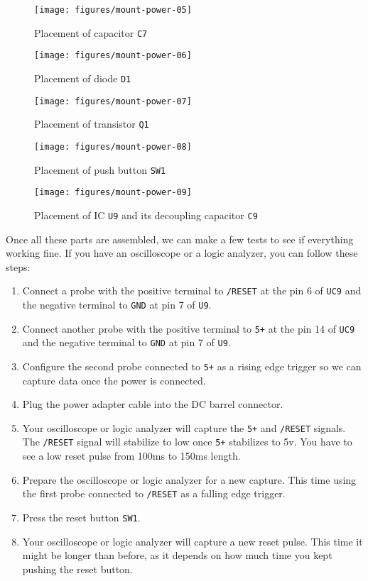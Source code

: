 \begin{figure}[htbp]
  \centering
  \texttt{[image: figures/mount-power-05]}
  \caption{Placement of capacitor {\tt C7}}
  \label{fig:mount-power-05}
\end{figure}

\begin{figure}[htbp]
  \centering
  \texttt{[image: figures/mount-power-06]}
  \caption{Placement of diode {\tt D1}}
  \label{fig:mount-power-06}
\end{figure}

\begin{figure}[htbp]
  \centering
  \texttt{[image: figures/mount-power-07]}
  \caption{Placement of transistor {\tt Q1}}
  \label{fig:mount-power-07}
\end{figure}

\begin{figure}[htbp]
  \centering
  \texttt{[image: figures/mount-power-08]}
  \caption{Placement of push button {\tt SW1}}
  \label{fig:mount-power-08}
\end{figure}

\begin{figure}[htbp]
  \centering
  \texttt{[image: figures/mount-power-09]}
  \caption{Placement of IC {\tt U9} and its decoupling capacitor {\tt C9}}
  \label{fig:mount-power-09}
\end{figure}

Once all these parts are assembled, we can make a few tests to see if everything working fine. If you have an oscilloscope or a logic analyzer, you can follow these steps:

\begin{enumerate}
  \item Connect a probe with the positive terminal to {\tt /RESET} at the pin 6 of {\tt UC9} and the negative terminal to {\tt GND} at pin 7 of {\tt U9}.
  \item Connect another probe with the positive terminal to {\tt 5+} at the pin 14 of {\tt UC9} and the negative terminal to {\tt GND} at pin 7 of {\tt U9}.
  \item Configure the second probe connected to {\tt 5+} as a rising edge trigger so we can capture data once the power is connected.
  \item Plug the power adapter cable into the DC barrel connector.
  \item Your oscilloscope or logic analyzer will capture the {\tt 5+} and {\tt /RESET} signals. The {\tt /RESET} signal will stabilize to low once {\tt 5+} stabilizes to 5v. You have to see a low reset pulse from 100ms to 150ms length.
  \item Prepare the oscilloscope or logic analyzer for a new capture. This time using the first probe connected to {\tt /RESET} as a falling edge trigger.
  \item Press the reset button {\tt SW1}.
  \item Your oscilloscope or logic analyzer will capture a new reset pulse. This time it might be longer than before, as it depends on how much time you kept pushing the reset button.
\end{enumerate}

